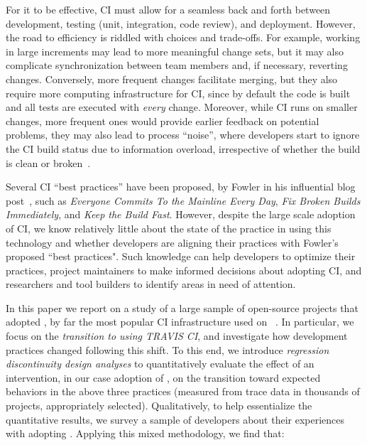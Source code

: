 For it to be effective, CI must allow for a seamless back and forth between
development, testing (\eg unit, integration, code review), and deployment. 
However, the road to efficiency is riddled with choices and trade-offs.
For example, working in large increments may lead to more meaningful
change sets, but it may also complicate synchronization between team 
members and, if necessary, reverting changes.
Conversely, more frequent changes facilitate merging, but they also require more 
computing infrastructure for CI, since by default the code is built and all 
tests are executed with \emph{every} change.
Moreover, while CI runs on smaller changes, more frequent ones would provide 
earlier feedback on potential problems, they may also lead to process 
``noise'', where developers start to ignore the CI build status due to 
information overload, irrespective of whether the build is clean or 
broken~\cite{DeadCI}.

Several CI ``best practices'' have been proposed, \eg by Fowler in his 
influential blog post~\cite{fowler2000continuous}, such as 
\emph{Everyone Commits To the Mainline Every Day}, 
\emph{Fix Broken Builds Immediately},
and \emph{Keep the Build Fast}.
However, despite the large scale adoption of CI, we know relatively little 
about the state of the practice in using this technology and whether 
developers are aligning their practices with Fowler's proposed ``best practices".
Such knowledge can help developers to optimize their practices, project 
maintainers to make informed decisions about adopting CI, and 
researchers and tool builders to identify areas in need of attention.

In this paper we report on a study of a large sample of \GH open-source 
projects that adopted \Tvis, by far the most popular 
CI infrastructure used on \GH~\cite{Hilton2016}.
In particular, we focus on the \emph{transition to using 
T{\footnotesize RAVIS} CI}, and investigate how development practices 
changed following this shift.
To this end, we introduce \emph{regression 
discontinuity design analyses} to quantitatively evaluate the effect of an intervention, in our case 
adoption of \Tvis, on the transition toward expected behaviors in the 
above three practices (measured from trace data in thousands of 
\GH projects, appropriately selected).
Qualitatively, to help essentialize the quantitative results, we survey a 
sample of \GH developers about their experiences with adopting \Tvis. 
Applying this mixed methodology, we find that:

